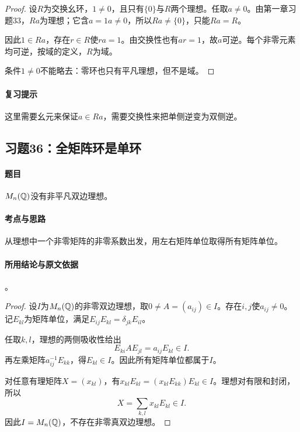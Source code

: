 
\begin{proof}
设$R$为交换幺环，$1\ne0$，且只有$\{0\}$与$R$两个理想。任取$a\ne0$。由第一章习题33，$Ra$为理想；它含$a=1a\ne0$，所以$Ra\ne\{0\}$，只能$Ra=R$。

因此$1\in Ra$，存在$r\in R$使$ra=1$。由交换性也有$ar=1$，故$a$可逆。每个非零元素均可逆，按域的定义，$R$为域。

条件$1\ne0$不能略去：零环也只有平凡理想，但不是域。
\end{proof}

\paragraph{复习提示}
这里需要幺元来保证$a\in Ra$，需要交换性来把单侧逆变为双侧逆。


\subsection{习题36：\texorpdfstring{全矩阵环是单环}{全矩阵环是单环}}
\label{ex:1:36}

\paragraph{题目}
$M_n(\mathbb Q)$没有非平凡双边理想。

\paragraph{考点与思路}
从理想中一个非零矩阵的非零系数出发，用左右矩阵单位取得所有矩阵单位。

\paragraph{所用结论与原文依据}
。


\begin{proof}
设$I$为$M_n(\mathbb Q)$的非零双边理想，取$0\ne A=(a_{ij})\in I$。存在$i,j$使$a_{ij}\ne0$。记$E_{kl}$为矩阵单位，满足$E_{ij}E_{kl}=\delta_{jk}E_{il}$。

任取$k,l$，理想的两侧吸收性给出
\[
E_{ki}AE_{jl}=a_{ij}E_{kl}\in I.
\]
再左乘矩阵$a_{ij}^{-1}E_{kk}$，得$E_{kl}\in I$。因此所有矩阵单位都属于$I$。

对任意有理矩阵$X=(x_{kl})$，有$x_{kl}E_{kl}=(x_{kl}E_{kk})E_{kl}\in I$。理想对有限和封闭，所以
\[
X=\sum_{k,l}x_{kl}E_{kl}\in I.
\]
因此$I=M_n(\mathbb Q)$，不存在非零真双边理想。
\end{proof}

